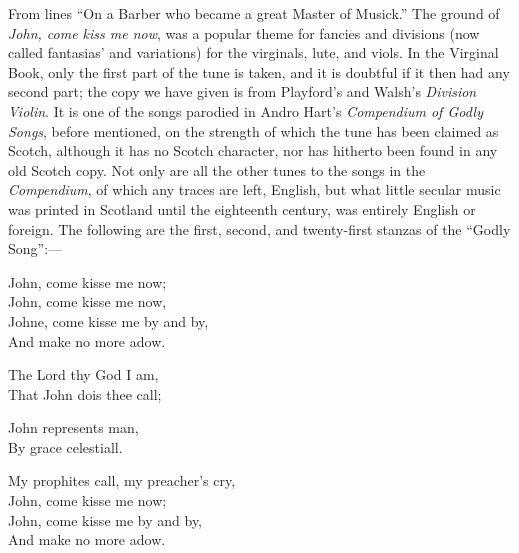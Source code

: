 From lines “On a Barber who became a great Master of Musick.” The ground of
\textit{John, come kiss me now}, was a popular theme for fancies and divisions (now
called fantasias' and variations) for the virginals, lute, and viols. In the
Virginal Book, only the first part of the tune is taken, and it is doubtful if it
then had any second part; the copy we have given is from Playford’s and Walsh’s
\textit{Division Violin}. It is one of the songs parodied in Andro Hart’s \textit{Compendium
of Godly Songs}, before mentioned, on the strength of which the tune has been
claimed as Scotch, although it has no Scotch character, nor has hitherto been
found in any old Scotch copy. Not only are all the other tunes to the songs in the
\textit{Compendium}, of which any traces are left, English, but what little secular music
was printed in Scotland until the eighteenth century, was entirely English or
foreign. The following are the first, second, and twenty-first stanzas of the
“Godly Song”:—
\settowidth{\versewidth}{My prophites call, my preacher's cry,}
\begin{dcverse}\begin{altverse}
John, come kisse me now;\\
John, come kisse me now,\\
Johne, come kisse me by and by,\\
And make no more adow.
\end{altverse}

\begin{altverse}
The Lord thy God I am,\\
That John dois thee call;\\
\end{altverse}
\begin{altverse}
John represents man,\\
By grace celestiall.
\end{altverse}

\begin{altverse}
My prophites call, my preacher's cry,\\
John, come kisse me now;\\
John, come kisse me by and by,\\
And make no more adow.
\end{altverse}
\end{dcverse}


\smallskip
{}

\pagebreak

